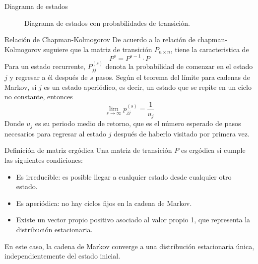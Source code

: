 \documentclass[12pt]{beamer}
\newcommand{\lr}{\longrightarrow}
\begin{document}
\begin{frame}{Diagrama de estados}
\begin{figure}[H]
\centering
{}
\caption{Diagrama de estados con probabilidades de transición.}
\end{figure}
\end{frame}

\begin{frame}{Relación de Chapman-Kolmogorov}
    De acuerdo a la relación de chapman-Kolmogorov suguiere que la matriz de transición 
    $P_{n\times n}$, tiene  la caracteristica de 
    \[
            P^s=P^{s-1}\cdot P
    \]
    Para un estado recurrente, $P_{jj}^{(s)}$ denota la probabilidad de comenzar en el estado $j$
    y regresar a él después de $s$ pasos. Según el teorema del límite para cadenas de Markov, si $j$ es un estado 
    aperiódico, es decir, un estado que se repite en un ciclo no constante,  entonces
    \[
            \lim\limits_{s\lr \infty} p_{jj}^{(s)}=\frac{1}{u_j}
    \]
    Donde $u_j$ es su periodo medio de retorno, que es el número esperado de pasos necesarios para regresar al estado 
    $j$ después de haberlo visitado por primera vez.
\end{frame}

\begin{frame}
    \begin{block}{Definición de matriz ergódica}
        Una matriz de transición $P$ es ergódica si cumple las siguientes
         condiciones:
        \begin{itemize}
            \item Es irreducible: es posible llegar a cualquier estado
             desde cualquier otro estado.
            \item Es aperiódica: no hay ciclos fijos en la cadena de Markov.
            \item Existe un vector propio positivo asociado al valor propio 1,
             que representa la distribución estacionaria.
        \end{itemize}
        En este caso, la cadena de Markov converge a una distribución estacionaria única, independientemente del estado inicial.
        
    \end{block}
\end{frame}
\end{document}
